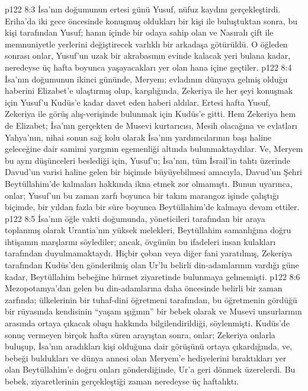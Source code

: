 \vs p122 8:3 İsa’nın doğumunun ertesi günü Yusuf, nüfuz kaydını gerçekleştirdi. Eriha’da iki gece öncesinde konuşmuş oldukları bir kişi ile buluştuktan sonra, bu kişi tarafından Yusuf; hanın içinde bir odaya sahip olan ve Nasıralı çift ile memnuniyetle yerlerini değiştirecek varlıklı bir arkadaşa götürüldü. O öğleden sonrası onlar, Yusuf’un uzak bir akrabasının evinde kalacak yeri bulana kadar, neredeyse üç hafta boyunca yaşayacakları yer olan hana içine geçtiler.
\vs p122 8:4 İsa’nın doğumunun ikinci gününde, Meryem; evladının dünyaya gelmiş olduğu haberini Elizabet’e ulaştırmış olup, karşılığında, Zekeriya ile her şeyi konuşmak için Yusuf’u Kudüs’e kadar davet eden haberi aldılar. Ertesi hafta Yusuf, Zekeriya ile görüş alış\hyp{}verişinde bulunmak için Kudüs’e gitti. Hem Zekeriya hem de Elizabet; İsa’nın gerçekten de Musevi kurtarıcısı, Mesih olacağına ve evlatları Yahya’nın, nihai sonun sağ kolu olarak İsa’nın yardımcılarının başı haline geleceğine dair samimi yargının egemenliği altında bulunmaktaydılar. Ve, Meryem bu aynı düşünceleri beslediği için, Yusuf’u; İsa’nın, tüm İsrail’in tahtı üzerinde Davud’un varisi haline gelen bir biçimde büyüyebilmesi amacıyla, Davud’un Şehri Beytüllahim’de kalmaları hakkında ikna etmek zor olmamıştı. Bunun uyarınca, onlar; Yusuf’un bu zaman zarfı boyunca bir takım marangoz işinde çalıştığı biçimde, bir yıldan fazla bir süre boyunca Beytüllahim’de kalmaya devam ettiler.
\vs p122 8:5 İsa’nın öğle vakti doğumunda, yöneticileri tarafından bir araya toplanmış olarak Urantia’nın yüksek melekleri, Beytüllahim samanlığına doğru ihtişamın marşlarını söylediler; ancak, övgünün bu ifadeleri insan kulakları tarafından duyulmamaktaydı. Hiçbir çoban veya diğer fani yaratılmış, Zekeriya tarafından Kudüs’den gönderilmiş olan Ur’lu belirli din\hyp{}adamlarının vardığı güne kadar, Beytüllahim bebeğine hürmet ziyaretinde bulunmaya gelmemişti.
\vs p122 8:6 Mezopotamya’dan gelen bu din\hyp{}adamlarına daha öncesinde belirli bir zaman zarfında; ülkelerinin bir tuhaf\hyp{}dini öğretmeni tarafından, bu öğretmenin gördüğü bir rüyasında kendisinin “yaşam ışığının” bir bebek olarak ve Musevi unsurlarının arasında ortaya çıkacak oluşu hakkında bilgilendirildiği, söylenmişti. Kudüs’de sonuç vermeyen birçok hafta süren arayıştan sonra, onlar; Zekeriya onlarla buluşup, İsa’nın aradıkları kişi olduğuna dair görüşünü ortaya çıkardığında, ve, bebeği buldukları ve dünya annesi olan Meryem’e hediyelerini bıraktıkları yer olan Beytüllahim’e doğru onları gönderdiğinde, Ur’a geri dönmek üzerelerdi. Bu bebek, ziyaretlerinin gerçekleştiği zaman neredeyse üç haftalıktı.
